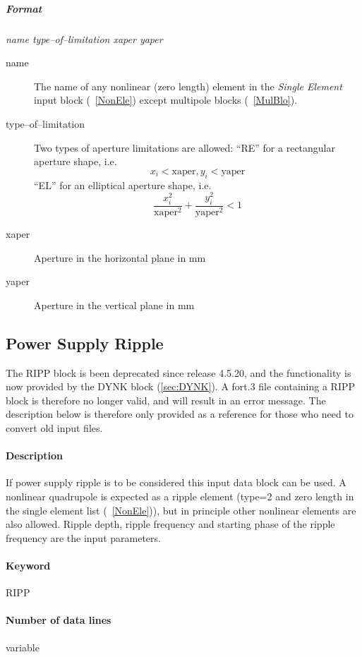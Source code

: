 \subparagraph{Format} {\em name type--of--limitation xaper yaper}

\begin{description}
\item [name] The name of any nonlinear (zero length) element in the
  {\em Single Element} \/input block (~\ref{NonEle}) except multipole
  blocks (~\ref{MulBlo}).
\item [type--of--limitation] Two types of aperture limitations are
  allowed: \newline ``RE'' for a rectangular aperture shape, i.e.\ 
  $$
  x_{i} < \mathrm{xaper}, y_{i} < \mathrm{yaper}
  $$
  ``EL'' for an elliptical aperture shape, i.e.\ 
  $$
  \frac{x_{i}^{2}}{\mathrm{xaper}^{2}} + \frac{y_{i}^{2}}
  {\mathrm{yaper}^{2}} < 1
  $$
\item [xaper] Aperture in the horizontal plane in mm
\item [yaper] Aperture in the vertical plane in mm
\end{description}

\subsection{Power Supply Ripple} \label{PowRip}

The RIPP block is been deprecated since release 4.5.20, and the functionality is now provided by the DYNK block (\ref{sec:DYNK}).
A fort.3 file containing a RIPP block is therefore no longer valid, and will result in an error message.
The description below is therefore only provided as a reference for those who need to convert old input files.

\paragraph{Description} If power supply ripple is to be considered
this input data block can be used. A nonlinear quadrupole is expected
as a ripple element (type=2 and zero length in the single element list
(~\ref{NonEle})), but in principle other nonlinear elements are also
allowed.  Ripple depth, ripple frequency and starting phase of the
ripple frequency are the input parameters.

\paragraph{Keyword} RIPP

\paragraph{Number of data lines} variable

